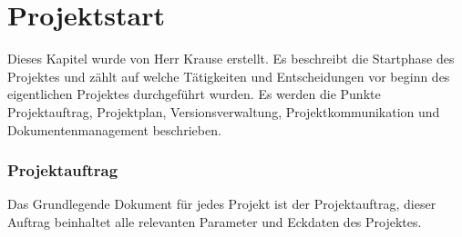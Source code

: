 \chapter{Projektstart}

Dieses Kapitel wurde von Herr Krause erstellt. Es beschreibt die Startphase des Projektes und zählt auf welche Tätigkeiten und Entscheidungen vor beginn des eigentlichen Projektes durchgeführt wurden. Es werden die Punkte Projektauftrag, Projektplan, Versionsverwaltung, Projektkommunikation und Dokumentenmanagement beschrieben.

\subsection{Projektauftrag}

Das Grundlegende Dokument für jedes Projekt ist der Projektauftrag, dieser Auftrag beinhaltet alle relevanten Parameter und Eckdaten des Projektes.

